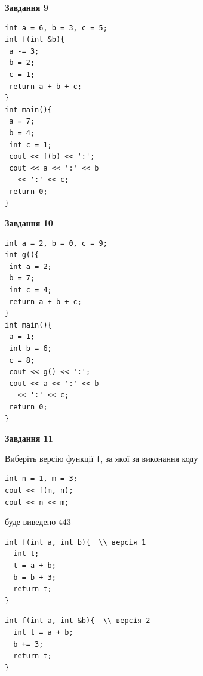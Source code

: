 \documentclass[12pt, ukrainian]{article}
\def\code#1{\Verb!#1!}
\begin{document}
{\begin {large}
\begin{minipage}[t]{11.0cm}
\end{minipage}


\begin{minipage}[t]{7.0cm}

\begin{center}
\textbf{Завдання 9}
\end{center}
\vspace{-8mm}

\begin{verbatim}
int a = 6, b = 3, c = 5;
int f(int &b){
 a -= 3;
 b = 2;
 c = 1;
 return a + b + c;
}
int main(){
 a = 7;
 b = 4;
 int c = 1;
 cout << f(b) << ':';
 cout << a << ':' << b 
   << ':' << c;
 return 0;
}
\end{verbatim}



\begin{center}
\textbf{Завдання 10}
\end{center}
\vspace{-8mm}

\begin{verbatim}
int a = 2, b = 0, c = 9;
int g(){
 int a = 2;
 b = 7;
 int c = 4;
 return a + b + c;
}
int main(){
 a = 1;
 int b = 6;
 c = 8;
 cout << g() << ':';
 cout << a << ':' << b 
   << ':' << c;
 return 0;
}
\end{verbatim}

\end{minipage}
\vline \hspace{1mm}
\begin{minipage}[t]{11.0cm}

\begin{center}
\textbf{Завдання 11}
\end{center}
Виберіть версію функції \code{f}, за якої за виконання коду
\begin{verbatim}
int n = 1, m = 3;
cout << f(m, n);
cout << n << m;
\end{verbatim}

буде виведено 443

\begin{verbatim}
int f(int a, int b){  \\ версія 1
  int t;
  t = a + b;
  b = b + 3;
  return t;
}
\end{verbatim}

\vspace{-8mm}\begin{verbatim}
int f(int a, int &b){  \\ версія 2
  int t = a + b;
  b += 3;
  return t;
}
\end{verbatim}


\end{minipage}
\end{large}}
\end{document}
